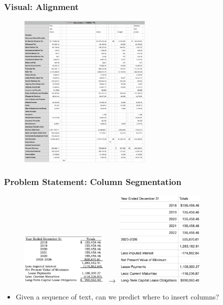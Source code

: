 \documentclass[usenames,dvipsnames]{beamer}
\begin{document}
\begin{frame}
  \frametitle{Visual: Alignment}
  \begin{figure}
    \includegraphics[height=7.5cm, valign=c]{assets/result1}
  \end{figure}
\end{frame}

\begin{frame}
  \frametitle{Problem Statement: Column Segmentation}
  \begin{figure}
    \includegraphics[width=4.25cm, valign=c]{assets/table}
    $\longrightarrow$
    \includegraphics[width=4.25cm, valign=c]{assets/csv}
  \end{figure}
  \begin{itemize}
    \item Given a sequence of text, can we predict where to insert columns?
  \end{itemize}
\end{frame}
\end{document}
